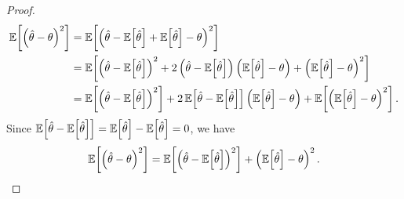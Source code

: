 \begin{proof}
    \begin{align*}
        \expectationof{\left(\hat{\theta} - \theta\right)^2} &= \expectationof{\left(\hat{\theta} - \expectationof{\hat{\theta}} + \expectationof{\hat{\theta}} - \theta\right)^2} \\
        &= \expectationof{\left(\hat{\theta} - \expectationof{\hat{\theta}}\right)^2 + 2\left(\hat{\theta} - \expectationof{\hat{\theta}}\right)\left(\expectationof{\hat{\theta}} - \theta\right) + \left(\expectationof{\hat{\theta}} - \theta\right)^2} \\
        &= \expectationof{\left(\hat{\theta} - \expectationof{\hat{\theta}}\right)^2} + 2\expectationof{\hat{\theta} - \expectationof{\hat{\theta}}}\left(\expectationof{\hat{\theta}} - \theta\right) + \expectationof{\left(\expectationof{\hat{\theta}} - \theta\right)^2}.
    \end{align*}
    Since $\operatorname{\mathbb{E}}\!\left[{\hat{\theta} - \operatorname{\mathbb{E}}\!\left[{\hat{\theta}}\right]}\right] = \operatorname{\mathbb{E}}\!\left[{\hat{\theta}}\right] - \operatorname{\mathbb{E}}\!\left[{\hat{\theta}}\right] = 0$, we have
    \begin{align*}
        \operatorname{\mathbb{E}}\!\left[{\left(\hat{\theta} - \theta\right)^2}\right] = \operatorname{\mathbb{E}}\!\left[{\left(\hat{\theta} - \operatorname{\mathbb{E}}\!\left[{\hat{\theta}}\right]\right)^2}\right] + \left(\operatorname{\mathbb{E}}\!\left[{\hat{\theta}}\right] - \theta\right)^2.
    \end{align*}
\end{proof}

